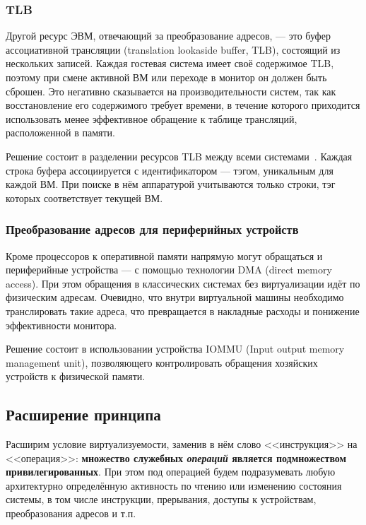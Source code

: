 \subsubsection{TLB}

Другой ресурс ЭВМ, отвечающий за преобразование адресов, --- это буфер ассоциативной трансляции (\abbr translation lookaside buffer, TLB), состоящий из нескольких записей. Каждая гостевая система имеет своё содержимое TLB, поэтому при смене активной ВМ или переходе в монитор он должен быть сброшен. Это негативно сказывается на производительности систем, так как восстановление его содержимого требует времени, в течение которого приходится использовать менее эффективное обращение к таблице трансляций, расположенной в памяти.

Решение состоит в разделении ресурсов TLB между всеми системами~\cite{YANG:2008}. Каждая строка буфера ассоциируется с идентификатором --- тэгом, уникальным для каждой ВМ. При поиске в нём аппаратурой учитываются только строки, тэг которых соответствует текущей ВМ.

\subsubsection{Преобразование адресов для периферийных устройств}

Кроме процессоров к оперативной памяти напрямую могут обращаться и периферийные устройства ---  с помощью технологии DMA (\abbr direct memory access). При этом обращения в классических системах без виртуализации идёт по физическим адресам. Очевидно, что внутри виртуальной машины необходимо транслировать такие адреса, что превращается в накладные расходы и понижение эффективности монитора. 

Решение состоит в использовании устройства IOMMU (\abbr Input output memory management unit), позволяющего контролировать обращения хозяйских устройств к физической памяти. 

\subsection{Расширение принципа}

Расширим условие виртуализуемости, заменив в нём слово <<инструкция>> на <<операция>>: \textbf{множество служебных \emph{операций} является подмножеством привилегированных}. При этом под операцией будем подразумевать любую архитектурно определённую активность по чтению или изменению состояния системы, в том числе инструкции, прерывания, доступы к устройствам, преобразования адресов и т.п.

